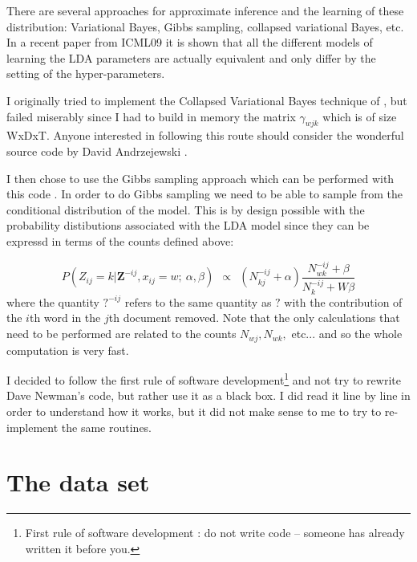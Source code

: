 \documentclass[11pt]{article}
\newcommand{\boldsymbol}[1]{\mathbf{#1}}
\begin{document}
    There are several approaches for approximate inference and the learning of these distribution:
    Variational Bayes, Gibbs sampling, collapsed variational Bayes, etc.
	In a recent paper from ICML09 \cite{Teh2009} it is shown that all the different models of
    learning the LDA parameters are actually equivalent and only differ by the setting of the hyper-parameters.

    I originally tried to implement the Collapsed Variational Bayes technique of \cite{Teh2007}, but
    failed miserably since I had to build in memory the matrix $\gamma_{wjk}$ which is of
    size WxDxT. Anyone interested in following this route should consider the wonderful source code 
    by David Andrzejewski \cite{AndrzejeCode}.

    I then chose to use the Gibbs sampling approach \cite{griffiths2004finding} which can be
    performed with this code \cite{NewmanCode}.
    In order to do Gibbs sampling we need to be able to sample from the conditional distribution
    of the model.
    This is by design possible with the probability distibutions associated with the LDA model
    since they can be expressd in terms of the counts defined above:
    
   \begin{equation}
        P(Z_{ij}=k|\boldsymbol{Z}^{-ij}, x_{ij}=w ; \ \alpha, \beta ) \ \  \propto \ \
        \left( N_{kj}^{-ij} +\alpha \right)\frac{ N_{wk}^{-ij} + \beta }{ N_k^{-ij} + W\beta }
    \end{equation}
    where the quantity $?^{-ij}$ refers to the same quantity as $?$ with the contribution of
    the $i$th word in the $j$th document removed.
    Note that the only calculations that need to be performed are related to the counts
    $N_{wj}, N_{wk},$ etc... and so the whole computation is very fast.

    I decided to follow the first rule of software development\footnote{First rule of software
    development : do not write code -- someone has already written it before you.} and not try to rewrite Dave Newman's
    code, but rather use it as a black box. I did read it line by line in order to understand how
    it works, but it did not make sense to me to try to re-implement the same routines.




\section{The data set} \label{section:data-set}
\end{document}
